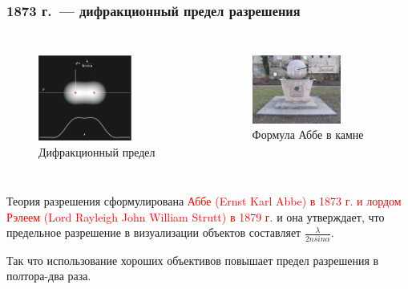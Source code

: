 \documentclass[9pt, compress, xcolor=table]{beamer}
\begin{document}
\begin{frame}[fragile]
  \frametitle{1873 г.~--- дифракционный предел разрешения}
  \begin{columns}[c]
\column{6cm}
\begin{figure}
\centering
\includegraphics[width=0.7\textwidth]{Abbe}
\\ Дифракционный предел
\end{figure}
 
\column{6cm}
\begin{figure}
\centering
\includegraphics[width=0.7\textwidth]{AbbeEqL}
\\ Формула Аббе в камне
\end{figure}

\end{columns}

Теория разрешения сформулирована \textcolor{red}{Аббе (Ernst
Karl Abbe) в 1873 г. и лордом Рэлеем (Lord Rayleigh John
William Strutt) в 1879 г.} и она утверждает, что предельное
разрешение в визуализации объектов составляет $\frac{\lambda}
{2 n sin \alpha}$.

Так что использование хороших объективов повышает предел разрешения в полтора-два раза.
\end{frame}
\end{document}
